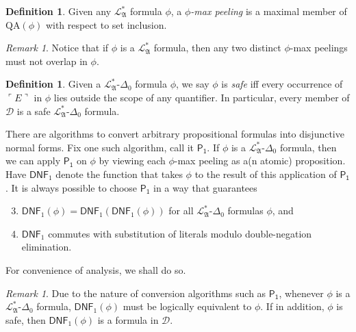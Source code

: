 \documentclass[12pt, twoside]{memoir}
\numberwithin{equation}{section}
\theoremstyle{definition}
\newtheorem{defi}[thm]{Definition}
\theoremstyle{remark}
\newtheorem{rem}[thm]{Remark}
\theoremstyle{definition}
\theoremstyle{definition}
\theoremstyle{definition}
\theoremstyle{remark}
\begin{document}
\begin{defi}
Given any $\mathcal{L}^{*}_{\mathfrak{A}}$ formula $\phi$, a $\phi$\emph{-max peeling} is a maximal member of $\mathrm{QA}(\phi)$ with respect to set inclusion.
\end{defi}

\begin{rem}\label{rem320}
Notice that if $\phi$ is a $\mathcal{L}^{*}_{\mathfrak{A}}$ formula, then any two distinct $\phi$-max peelings must not overlap in $\phi$.
\end{rem} 

\begin{defi}
Given a $\mathcal{L}^{*}_{\mathfrak{A}}$-$\Delta_0$ formula $\phi$, we say $\phi$ is \emph{safe} iff every occurrence of $\ulcorner E \urcorner$ in $\phi$ lies outside the scope of any quantifier. In particular, every member of $\mathcal{D}$ is a safe $\mathcal{L}^{*}_{\mathfrak{A}}$-$\Delta_0$ formula.
\end{defi}

There are algorithms to convert arbitrary propositional formulas into disjunctive normal forms. Fix one such algorithm, call it $\mathsf{P_1}$. If $\phi$ is a $\mathcal{L}^{*}_{\mathfrak{A}}$-$\Delta_0$ formula, then we can apply $\mathsf{P_1}$ on $\phi$ by viewing each $\phi$-max peeling as a(n atomic) proposition. Have $\mathsf{DNF}_1$ denote the function that takes $\phi$ to the result of this application of $\mathsf{P_1}$. It is always possible to choose $\mathsf{P_1}$ in a way that guarantees
\begin{enumerate}[label=(\Roman*)]
    \setcounter{enumi}{2}
    \item\label{s323} $\mathsf{DNF}_1(\phi) = \mathsf{DNF}_1(\mathsf{DNF}_1(\phi))$ for all $\mathcal{L}^{*}_{\mathfrak{A}}$-$\Delta_0$ formulas $\phi$, and
    \item\label{s324} $\mathsf{DNF}_1$ commutes with substitution of literals modulo double-negation elimination.
\end{enumerate}
For convenience of analysis, we shall do so.

\begin{rem}\label{rem322}
Due to the nature of conversion algorithms such as $\mathsf{P_1}$, whenever $\phi$ is a $\mathcal{L}^{*}_{\mathfrak{A}}$-$\Delta_0$ formula, $\mathsf{DNF}_1(\phi)$ must be logically equivalent to $\phi$. If in addition, $\phi$ is safe, then $\mathsf{DNF}_1(\phi)$ is a formula in $\mathcal{D}$.
\end{rem}
\end{document}

